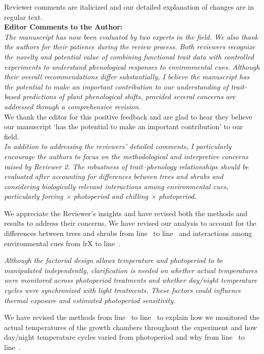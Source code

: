 \documentclass[11pt,a4paper]{article}
\newcommand{\lr}[1]{line~\lineref{#1}}
\begin{document}
\renewcommand{\bibname}{References}%

Reviewer comments are italicized and our detailed explanation of changes are in regular text. \\

\textbf{Editor Comments to the Author:}\\
\emph{The manuscript has now been evaluated by two experts in the field. We also thank the authors for their patience during the review process. Both reviewers recognize the novelty and potential value of combining functional trait data with controlled experiments to understand phenological responses to environmental cues. Although their overall recommendations differ substantially, I believe the manuscript has the potential to make an important contribution to our understanding of trait-based predictions of plant phenological shifts, provided several concerns are addressed through a comprehensive revision.}\\

We thank the editor for this positive feedback and are glad to hear they believe our manuscript `has the potential to make an important contribution' to our field.\\ 
        
\emph{ In addition to addressing the reviewers' detailed comments, I particularly encourage the authors to focus on the methodological and interpretive concerns raised by Reviewer 2. The robustness of trait–phenology relationships should be evaluated after accounting for differences between trees and shrubs and considering biologically relevant interactions among environmental cues, particularly forcing × photoperiod and chilling × photoperiod. }

We appreciate the Reviewer's insights and have revised both the methods and results to address their concerns. We have revised our analysis to account for the differences between trees and shrubs from \lr{X} to \lr{Y} and interactions among environmental cues from lr{X} to \lr{Y}.

\emph{Although the factorial design allows temperature and photoperiod to be manipulated independently, clarification is needed on whether actual temperatures were monitored across photoperiod treatments and whether day/night temperature cycles were synchronized with light treatments. These factors could influence thermal exposure and estimated photoperiod sensitivity.}

We have revised the methods from \lr{X} to \lr{Y}  to explain how we monitored the actual temperatures of the growth chambers throughout the experiment and how day/night temperature cycles varied from photoperiod and why from \lr{X} to \lr{Y}.\\
\end{document}
